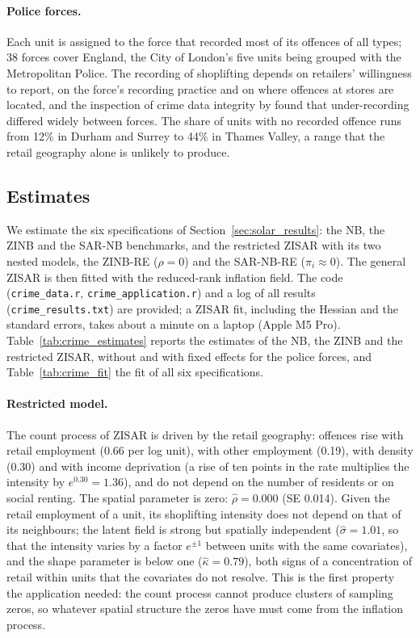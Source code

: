 \paragraph{Police forces.}
Each unit is assigned to the force that recorded most of its offences of all types; 38 forces cover England, the City of London's five units being grouped with the Metropolitan Police.
The recording of shoplifting depends on retailers' willingness to report, on the force's recording practice and on where offences at stores are located, and the inspection of crime data integrity by \citet{hmic2014} found that under-recording differed widely between forces.
The share of units with no recorded offence runs from 12\% in Durham and Surrey to 44\% in Thames Valley, a range that the retail geography alone is unlikely to produce.

\subsection{Estimates}\label{sec:crime_results}

We estimate the six specifications of Section~\ref{sec:solar_results}: the NB, the ZINB and the SAR-NB benchmarks, and the restricted ZISAR with its two nested models, the ZINB-RE ($\rho = 0$) and the SAR-NB-RE ($\pi_i \approx 0$).
The general ZISAR is then fitted with the reduced-rank inflation field.
The code (\texttt{crime\_data.r}, \texttt{crime\_application.r}) and a log of all results (\texttt{crime\_results.txt}) are provided; a ZISAR fit, including the Hessian and the standard errors, takes about a minute on a laptop (Apple M5 Pro).
Table~\ref{tab:crime_estimates} reports the estimates of the NB, the ZINB and the restricted ZISAR, without and with fixed effects for the police forces, and Table~\ref{tab:crime_fit} the fit of all six specifications.

\paragraph{Restricted model.}
The count process of ZISAR is driven by the retail geography: offences rise with retail employment (0.66 per log unit), with other employment (0.19), with density (0.30) and with income deprivation (a rise of ten points in the rate multiplies the intensity by $e^{0.30} = 1.36$), and do not depend on the number of residents or on social renting.
The spatial parameter is zero: $\hat\rho = 0.000$ (SE 0.014).
Given the retail employment of a unit, its shoplifting intensity does not depend on that of its neighbours; the latent field is strong but spatially independent ($\hat\sigma = 1.01$, so that the intensity varies by a factor $e^{\pm 1}$ between units with the same covariates), and the shape parameter is below one ($\hat\kappa = 0.79$), both signs of a concentration of retail within units that the covariates do not resolve.
This is the first property the application needed: the count process cannot produce clusters of sampling zeros, so whatever spatial structure the zeros have must come from the inflation process.


